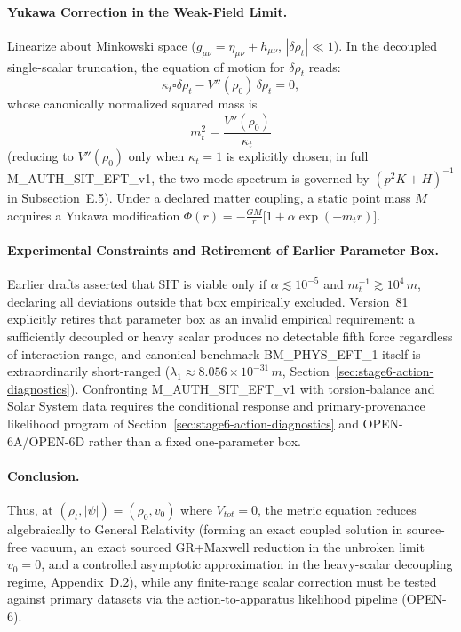\documentclass[american,11pt,letterpaper]{article}
\def\mathrm#1{#1}%
\def\texttt#1{#1}%
\def\emph#1{#1}%
\begin{document}
\paragraph{Yukawa Correction in the Weak-Field Limit.}
Linearize about Minkowski space ($g_{\mu\nu} = \eta_{\mu\nu} + h_{\mu\nu}$, $|\delta \rho_t| \ll 1$). In the decoupled single-scalar truncation, the equation of motion for $\delta\rho_t$ reads:
\[
\kappa_t \square \delta\rho_t - V''(\rho_0)\, \delta\rho_t = 0,
\]
whose canonically normalized squared mass is
\[
m_t^2 = \frac{V''(\rho_0)}{\kappa_t}
\]
(reducing to $V''(\rho_0)$ only when $\kappa_t = 1$ is explicitly chosen; in full \texttt{M\_AUTH\_SIT\_EFT\_v1}, the two-mode spectrum is governed by $(p^2 K + H)^{-1}$ in Subsection~E.5). Under a declared matter coupling, a static point mass $M$ acquires a Yukawa modification $\Phi(r) = -\frac{GM}{r}\bigl[1 + \alpha \exp(-m_t r)\bigr]$.

\paragraph{Experimental Constraints and Retirement of Earlier Parameter Box.}
Earlier drafts asserted that SIT is viable only if $\alpha \lesssim 10^{-5}$ and $m_t^{-1} \gtrsim 10^4\,\mathrm{m}$, declaring all deviations outside that box empirically excluded. Version~81 explicitly \emph{retires} that parameter box as an invalid empirical requirement: a sufficiently decoupled or heavy scalar produces no detectable fifth force regardless of interaction range, and canonical benchmark \texttt{BM\_PHYS\_EFT\_1} itself is extraordinarily short-ranged ($\lambda_1 \approx 8.056\times 10^{-31}\,\mathrm{m}$, Section~\ref{sec:stage6-action-diagnostics}). Confronting \texttt{M\_AUTH\_SIT\_EFT\_v1} with torsion-balance and Solar System data requires the conditional response and primary-provenance likelihood program of Section~\ref{sec:stage6-action-diagnostics} and \texttt{OPEN-6A}/\texttt{OPEN-6D} rather than a fixed one-parameter box.

\paragraph{Conclusion.}
Thus, at $(\rho_t, |\psi|) = (\rho_0, v_0)$ where $V_{\mathrm{tot}} = 0$, the metric equation reduces algebraically to General Relativity (forming an exact coupled solution in source-free vacuum, an exact sourced GR+Maxwell reduction in the unbroken limit $v_0 = 0$, and a controlled asymptotic approximation in the heavy-scalar decoupling regime, Appendix~D.2), while any finite-range scalar correction must be tested against primary datasets via the action-to-apparatus likelihood pipeline (\texttt{OPEN-6}).
\end{document}

